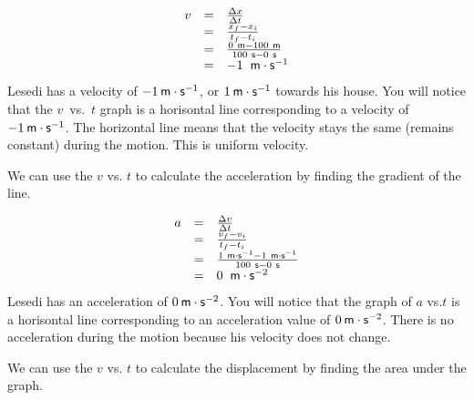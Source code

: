     \begin{equation}
    \begin{array}{ccc}\hfill v& =& \frac{\Delta x}{\Delta t}\hfill \\ & =& \frac{{x}_{f}-{x}_{i}}{{t}_{f}-{t}_{i}}\hfill \\ & =& \frac{0\phantom{\rule{3.33333pt}{0ex}}\mathsf{m}-100\phantom{\rule{3.33333pt}{0ex}}\mathsf{m}}{100\phantom{\rule{3.33333pt}{0ex}}\mathsf{s}-0\phantom{\rule{3.33333pt}{0ex}}\mathsf{s}}\hfill \\ & =& -1\phantom{\rule{4pt}{0ex}}\phantom{\rule{0.166667em}{0ex}}\mathsf{m}\ensuremath{\cdot}{\mathsf{s}}^{-1}\hfill \end{array}
      \end{equation}
        \label{m38795*id70472}Lesedi has a velocity of $-1\phantom{\rule{2pt}{0ex}}\mathsf{m}\ensuremath{\cdot}\mathsf{s}{}^{-1}$, or $1\phantom{\rule{2pt}{0ex}}\mathsf{m}\ensuremath{\cdot}\mathsf{s}{}^{-1}$ towards his house. You will notice that the $v$~vs.~$t$ graph is a horisontal line corresponding to a velocity of $-1\phantom{\rule{2pt}{0ex}}\mathsf{m}\ensuremath{\cdot}\mathsf{s}{}^{-1}$. The horizontal line means that the velocity stays the same (remains constant) during the motion. This is uniform velocity.\par 
        \label{m38795*id70573}We can use the $v$ vs. $t$ to calculate the acceleration by finding the gradient of the line.\par 
        \label{m38795*id70595}\nopagebreak\noindent{}
          
    \begin{equation}
    \begin{array}{ccc}\hfill a& =& \frac{\Delta v}{\Delta t}\hfill \\ & =& \frac{{v}_{f}-{v}_{i}}{{t}_{f}-{t}_{i}}\hfill \\ & =& \frac{1\phantom{\rule{3.33333pt}{0ex}}\mathsf{m}\ensuremath{\cdot}{\mathsf{s}}^{-1}-1\phantom{\rule{3.33333pt}{0ex}}\mathsf{m}\ensuremath{\cdot}{\mathsf{s}}^{-1}}{100\phantom{\rule{3.33333pt}{0ex}}\mathsf{s}-0\phantom{\rule{3.33333pt}{0ex}}\mathsf{s}}\hfill \\ & =& 0\phantom{\rule{4pt}{0ex}}\phantom{\rule{0.166667em}{0ex}}\mathsf{m}\ensuremath{\cdot}{\mathsf{s}}^{-2}\hfill \end{array}
      \end{equation}
        \label{m38795*id70807}Lesedi has an acceleration of $0\phantom{\rule{2pt}{0ex}}\mathsf{m}\ensuremath{\cdot}\mathsf{s}{}^{-2}$. You will notice that the graph of $a$ vs.$t$ is a horisontal line corresponding to an acceleration value of $0\phantom{\rule{2pt}{0ex}}\mathsf{m}\ensuremath{\cdot}\mathsf{s}{}^{-2}$. There is no acceleration during the motion because his velocity does not change.\par 
        \label{m38795*id70880}We can use the $v$ vs. $t$ to calculate the displacement by finding the area under the graph.\par 
        \label{m38795*id70902}\nopagebreak\noindent{}
          
